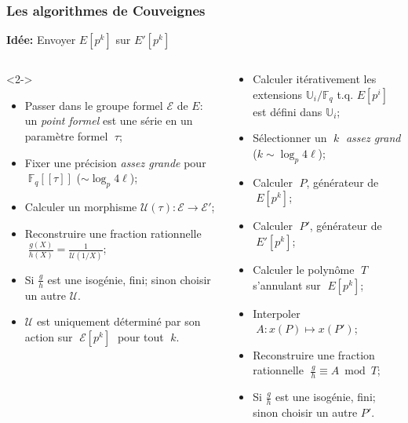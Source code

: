 \documentclass[10pt]{beamer}
\newcommand{\U}{\mathbb{U}}  %
\newcommand{\F}{\mathbb{F}}  %
\newcommand{\0}{\mathcal{O}}  %
\begin{document}

{
\begin{frame}
  \frametitle{Les algorithmes de Couveignes}
  
  \begin{center}
    \textbf{Idée:} Envoyer $E[p^k]$ sur $E'[p^k]$
  \end{center}

  \begin{columns}[t]
    \begin{column}{0.5\textwidth}
      \centering\cite{couveignes94}

      \begin{uncoverenv}<2-> 
        \begin{itemize}
        \item Passer dans le groupe formel $\mathcal{E}$ de $E$: un
          \emph{point formel} est une série en un paramètre formel
          $\;\tau$;
        \item Fixer une précision \emph{assez grande} pour
          $\;\F_q[[\tau]]$ ($\sim\log_p4\ell$);
        \item Calculer un morphisme $\mathcal{U}(\tau) : \mathcal{E}
          \to \mathcal{E}'$;
        \item Reconstruire une fraction rationnelle
          $\;\frac{g(X)}{h(X)} = \frac{1}{\mathcal{U}(1/X)}$;
        \item Si $\frac{g}{h}$ est une isogénie, fini; sinon choisir
          un autre $\mathcal{U}$.
        \item<3> $\mathcal{U}$ est uniquement déterminé par son action
          sur $\;\mathcal{E}[p^k]\;$ pour tout $\;k$.
        \end{itemize}
      \end{uncoverenv}
    \end{column}
    \begin{column}{0.5\textwidth}
      \centering\cite{couveignes96}
      
      \begin{itemize}
      \item Calculer itérativement les extensions $\U_i/\F_q$
        t.q. $E[p^i]$ est défini dans $\U_i$;
      \item Sélectionner un $\;k\;$ \emph{assez grand} ($k\sim\log_p4\ell$);
      \item Calculer $\;P$, générateur de $\;E[p^k]$;
      \item Calculer $\;P'$, générateur de $\;E'[p^k]$;
      \item Calculer le polynôme $\;T\;$ s'annulant sur $\;E[p^k]$;
      \item Interpoler $\;A : x(P) \mapsto x(P')$;
      \item Reconstruire une fraction rationnelle $\;\frac{g}{h}\equiv A \bmod T$;
      \item Si $\frac{g}{h}$ est une isogénie, fini; sinon choisir un autre $P'$.
      \end{itemize}
    \end{column}
  \end{columns}
\end{frame}
}
\end{document}
